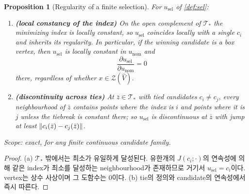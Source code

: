 \documentclass[11pt]{article}
\theoremstyle{plain}
\newtheorem{proposition}[theorem]{Proposition}
\theoremstyle{definition}
\theoremstyle{remark}
\DeclarePairedDelimiter{\norm}{\lVert}{\rVert}
\newcommand{\calT}{\mathcal{T}}
\newcommand{\Vhat}{\widehat V}
\begin{document}
\begin{proposition}[Regularity of a finite selection]\label{prop:sel}
For $u_{\mathrm{sel}}$ of \cref{def:sel}:
\begin{enumerate}[label=(\alph*)]
  \item \textbf{(local constancy of the index)} On the open complement of $\calT_\ast$ the
  minimizing index is locally constant, so $u_{\mathrm{sel}}$ coincides locally with a single
  $c_i$ and inherits its regularity. In particular, if the winning candidate is a box vertex,
  then $u_{\mathrm{sel}}$ is locally constant in $u_{\mathrm{nom}}$ and
  \begin{equation}
  \frac{\partial u_{\mathrm{sel}}}{\partial u_{\mathrm{nom}}}=0
  \end{equation}
  there, regardless of whether $x\in\mathcal Z(\Vhat)$.
  \item \textbf{(discontinuity across ties)} At $\bar z\in\calT_\ast$ with tied candidates
  $c_i\neq c_j$, every neighbourhood of $\bar z$ contains points where the index is $i$ and
  points where it is $j$ unless the tiebreak is constant there; so $u_{\mathrm{sel}}$ is
  discontinuous at $\bar z$ with jump at least $\norm{c_i(\bar z)-c_j(\bar z)}$.
\end{enumerate}
Scope: exact, for any finite continuous candidate family.
\end{proposition}
\begin{proof}
(a) $\calT_\ast$ 밖에서는 최소가 유일하게 달성된다. 유한개의 $J(c_i;\cdot)$의 연속성에 의해 같은
index가 최소를 달성하는 neighbourhood가 존재하므로 거기서 $u_{\mathrm{sel}}=c_i$이다. vertex는 상수
사상이며 그 도함수는 $0$이다. (b) tie의 정의와 candidate의 연속성에서 즉시 따른다.
\end{proof}
\end{document}
